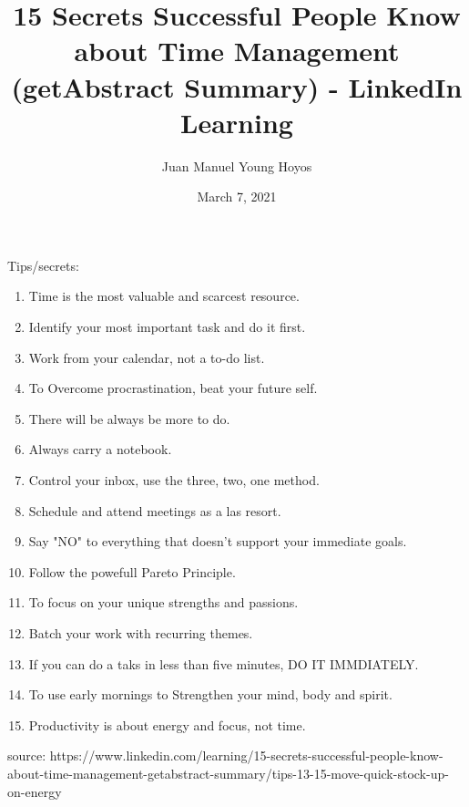 \documentclass[12pt, letterpaper, twoside]{article}
\title{15 Secrets Successful People Know about Time Management (getAbstract Summary) - LinkedIn Learning}
\author{Juan Manuel Young Hoyos}
\date{March 7, 2021}
\begin{document}
\maketitle

Tips/secrets:

\begin{enumerate}
	\item Time is the most valuable and scarcest resource.
	\item Identify your most important task and do it first.
	\item Work from your calendar, not a to-do list.
	\item To Overcome procrastination, beat your future self.
	\item There will be always be more to do.
	\item Always carry a notebook.
	\item Control your inbox, use the three, two, one method.
	\item Schedule and attend meetings as a las resort.
	\item Say "NO" to everything that doesn't support your immediate goals.
	\item Follow the powefull Pareto Principle.
	\item To focus on your unique strengths and passions.
	\item Batch your work with recurring themes.
	\item If you can do a taks in less than five minutes, DO IT IMMDIATELY.
	\item To use early mornings to Strengthen your mind, body and spirit.
	\item Productivity is about energy and focus, not time.
\end{enumerate}

source: https://www.linkedin.com/learning/15-secrets-successful-people-know-about-time-management-getabstract-summary/tips-13-15-move-quick-stock-up-on-energy
\end{document}
